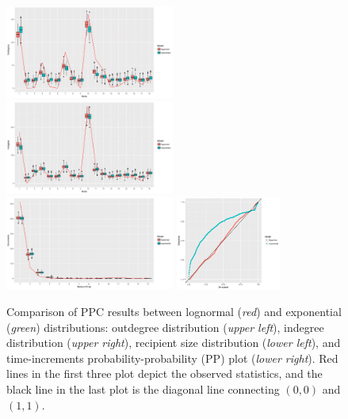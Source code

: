 \documentclass[ba]{imsart}
\numberwithin{equation}{section}
\theoremstyle{plain}
\begin{document}
	\fi
		\begin{figure}[H]
			\centering
			\includegraphics[width=0.495\textwidth]{img/outdegree_two-1.png}	
			\includegraphics[width=0.495\textwidth]{img/indegree_two-1.png}	
			\includegraphics[width=0.495\textwidth]{img/recipientsize_two-1.png}	
			\includegraphics[width=0.31\textwidth]{img/timepp_two-1.png}
			\caption {Comparison of PPC results between lognormal (\textit{red}) and exponential (\textit{green}) distributions: outdegree distribution (\textit{upper left}), indegree distribution (\textit{upper right}), recipient size distribution (\textit{lower left}), and time-increments probability-probability (PP) plot  (\textit{lower right}). Red lines in the first three plot depict the observed statistics, and the black line in the last plot is the diagonal line connecting $(0, 0)$ and $(1, 1)$.}
			\label{figure:PPCtwo}
		\end{figure}

\begin{supplement}
\label{suppA} 
\end{supplement}




\end{document}
